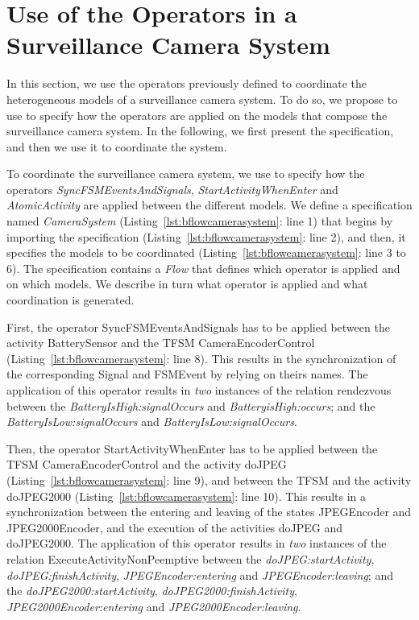 \section{Use of the Operators in a Surveillance Camera System}
In this section, we use the operators previously defined to coordinate the heterogeneous models of a surveillance camera system. To do so, we propose to use \bflow to specify how the operators are applied on the models that compose the surveillance camera system. In the following, we first present the \bflow specification, and then we use it to coordinate the system. 

To coordinate the surveillance camera system, we use \bflow to specify how the operators \emph{SyncFSMEventsAndSignals}, \emph{StartActivityWhenEnter} and \emph{AtomicActivity} are applied between the different models. We define a \bflow specification named \emph{CameraSystem} (Listing~\ref{lst:bflowcamerasystem}: line 1) that begins by importing the \bcool specification (Listing~\ref{lst:bflowcamerasystem}: line 2), and then, it specifies the models to be coordinated (Listing~\ref{lst:bflowcamerasystem}: line 3 to 6). The specification contains a \emph{Flow} that defines which operator is applied and on which models. We describe in turn what operator is applied and what coordination is generated.

First, the operator SyncFSMEventsAndSignals has to be applied between the activity BatterySensor and the TFSM CameraEncoderControl (Listing~\ref{lst:bflowcamerasystem}: line 8). This results in the synchronization of the corresponding Signal and FSMEvent by relying on theirs names. The application of this operator results in \emph{two} instances of the \ccsl relation rendezvous between the \mse \emph{BatteryIsHigh:signalOccurs} and \emph{BatteryisHigh:occurs}; and the \mse \emph{BatteryIsLow:signalOccurs} and \emph{BatteryIsLow:signalOccurs}. 

Then, the operator StartActivityWhenEnter has to be applied between the TFSM CameraEncoderControl and the activity doJPEG (Listing~\ref{lst:bflowcamerasystem}: line 9), and between the TFSM and the activity doJPEG2000 (Listing~\ref{lst:bflowcamerasystem}: line 10). This results in a synchronization between the entering and leaving of the states JPEGEncoder and JPEG2000Encoder, and the execution of the activities doJPEG and doJPEG2000. The application of this operator results in \emph{two} instances of the \moccml relation ExecuteActivityNonPeemptive between the \mse \emph{doJPEG:startActivity}, \emph{doJPEG:finishActivity}, \emph{JPEGEncoder:entering} and \emph{JPEGEncoder:leaving}; and the \mse \emph{doJPEG2000:startActivity}, \emph{doJPEG2000:finishActivity}, \emph{JPEG2000Encoder:entering} and \emph{JPEG2000Encoder:leaving}.   

